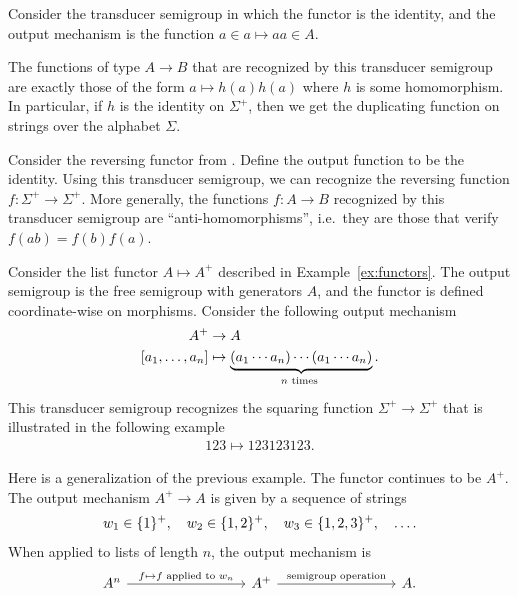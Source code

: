 \begin{example}\label{ex:duplicator}
    Consider the transducer semigroup in which the functor is the identity, and the output mechanism is the function $a \in a \mapsto aa \in A$.

    The functions of type $A \to B$ that are recognized by this transducer semigroup are exactly those of the form $a \mapsto h(a)h(a)$ where $h$ is some homomorphism. In particular, if $h$ is the identity on $\Sigma^+$, then we get the duplicating function on strings over the alphabet $\Sigma$.
\end{example}



\begin{example}
    Consider the reversing functor from . Define the output function to be the identity. Using this transducer semigroup, we can recognize the reversing function $f : \Sigma^+ \to \Sigma^+$. More generally, the functions $f : A \to B$ recognized by this transducer semigroup are \enquote{anti-homomorphisms}, i.e.\ they are those that verify $f(ab) = f(b)f(a)$.
\end{example}

\begin{example}\label{ex:squaring}
    Consider the list functor $A \mapsto A^+$ described in Example~\ref{ex:functors}. The output semigroup is the free semigroup with generators $A$, and the functor is defined coordinate-wise on morphisms. Consider the following output mechanism 
    \begin{align*}
    A^+ & \to A\\
    [a_1,\ldots,a_n] & \mapsto \myunderbrace{(a_1 \cdots a_n) \cdots (a_1 \cdots a_n)}{$n$ times}.
    \end{align*}
    This transducer semigroup recognizes the squaring function $\Sigma^+ \to \Sigma^+$ that is illustrated in the following example 
    \begin{align*}
    123 \mapsto 123123123.
    \end{align*}
\end{example}

\begin{example}\label{ex:squaring-generalized}
    Here is a generalization of the previous example. The functor continues to be $A^+$. The output mechanism $A^+ \to A$ is given by a sequence of strings 
    \begin{align*}
    w_1 \in \{1\}^+, \quad w_2 \in \{1,2\}^+, \quad w_3 \in \{1,2,3\}^+, \quad \ldots.
    \end{align*}
    When applied to lists of  length $n$, the output mechanism is
    \[
        \begin{tikzcd}
            [column  sep=3cm]
        A^n
        \ar[r,"f \mapsto \text{$f$ applied to $w_n$}"]
        &
        A^+ 
        \ar[r,"\text{semigroup operation}"]
        & 
        A.
        \end{tikzcd}
        \]
\end{example}

